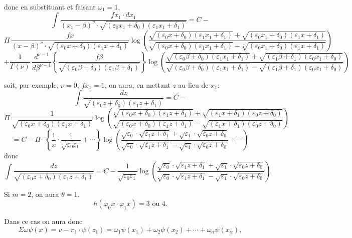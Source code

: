 \documentclass{article}
\begin{document}
donc en substituant et faisant $\omega_1 = 1$,
\[ \int \frac{f x_1 \cdot dx_1}{(x_1-\beta)^{\nu} \cdot \sqrt{(\varepsilon_0 x_1+\delta_0)(\varepsilon_1 x_1+\delta_1)}} = C - \tag{204} \]
\[ \Pi\,\frac{f x}{(x-\beta)^{\nu} \cdot \sqrt{(\varepsilon_0 x+\delta_0)(\varepsilon_1 x+\delta_1)}}\log\left(\frac{\sqrt{(\varepsilon_0 x+\delta_0)(\varepsilon_1 x_1+\delta_1)}+\sqrt{(\varepsilon_0 x_1+\delta_0)(\varepsilon_1 x+\delta_1)}}{\sqrt{(\varepsilon_0 x+\delta_0)(\varepsilon_1 x_1+\delta_1)}-\sqrt{(\varepsilon_0 x_1+\delta_0)(\varepsilon_1 x+\delta_1)}}\right) \]
\[ + \frac{1}{\Gamma(\nu)}\,\frac{d^{\nu-1}}{d\beta^{\nu-1}} \left\{ \frac{f\beta}{\sqrt{(\varepsilon_0\beta+\delta_0)(\varepsilon_1\beta+\delta_1)}} \right\} \log\left(\frac{\sqrt{(\varepsilon_0\beta+\delta_0)(\varepsilon_1 x_1+\delta_1)}+\sqrt{(\varepsilon_1\beta+\delta_1)(\varepsilon_0 x_1+\delta_0)}}{\sqrt{(\varepsilon_0\beta+\delta_0)(\varepsilon_1 x_1+\delta_1)}-\sqrt{(\varepsilon_1\beta+\delta_1)(\varepsilon_0 x_1+\delta_0)}}\right) \]

soit, par exemple, $\nu = 0$, $f x_1 = 1$, on aura, en mettant $z$ au lieu de $x_1$:
\[ \int \frac{dz}{\sqrt{(\varepsilon_0 z+\delta_0)(\varepsilon_1 z+\delta_1)}} = C - \]
\[ \Pi\,\frac{1}{\sqrt{(\varepsilon_0 x+\delta_0)(\varepsilon_1 x+\delta_1)}}\log\left(\frac{\sqrt{(\varepsilon_0 x+\delta_0)(\varepsilon_1 z+\delta_1)}+\sqrt{(\varepsilon_1 x+\delta_1)(\varepsilon_0 z+\delta_0)}}{\sqrt{(\varepsilon_0 x+\delta_0)(\varepsilon_1 z+\delta_1)}-\sqrt{(\varepsilon_1 x+\delta_1)(\varepsilon_0 z+\delta_0)}}\right) \]
\[ = C - \Pi \cdot \left\{ \frac{1}{x} \cdot \frac{1}{\sqrt{\varepsilon_0\varepsilon_1}}+\cdots \right\}\log\left(\frac{\sqrt{\varepsilon_0} \cdot \sqrt{\varepsilon_1 z+\delta_1}+\sqrt{\varepsilon_1} \cdot \sqrt{\varepsilon_0 z+\delta_0}}{\sqrt{\varepsilon_0} \cdot \sqrt{\varepsilon_1 z+\delta_1}-\sqrt{\varepsilon_1} \cdot \sqrt{\varepsilon_0 z+\delta_0}}+\cdots\right) \]
donc
\[ \int \frac{dz}{\sqrt{(\varepsilon_0 z+\delta_0)(\varepsilon_1 z+\delta_1)}} = C - \frac{1}{\sqrt{\varepsilon_0\varepsilon_1}}\log\left(\frac{\sqrt{\varepsilon_0} \cdot \sqrt{\varepsilon_1 z+\delta_1}+\sqrt{\varepsilon_1} \cdot \sqrt{\varepsilon_0 z+\delta_0}}{\sqrt{\varepsilon_0} \cdot \sqrt{\varepsilon_1 z+\delta_1}-\sqrt{\varepsilon_1} \cdot \sqrt{\varepsilon_0 z+\delta_0}}\right) \]

Si $m = 2$, on aura $\theta = 1$.
\[ h(\varphi_0 x \cdot \varphi_1 x) = 3 \text{ ou } 4. \]

Dans ce cas on aura donc
\[ \Sigma\omega\psi(x) = v - \pi_1 \cdot \psi(z_1) = \omega_1\psi(x_1)+\omega_2\psi(x_2)+\cdots+\omega_\alpha\psi(x_\alpha), \tag{205} \]
\end{document}
